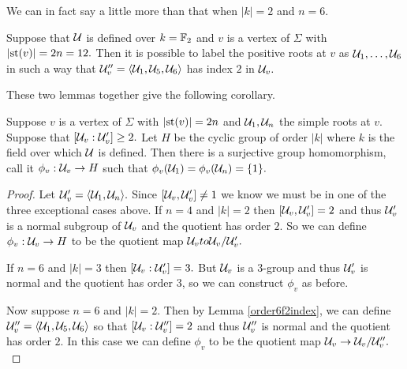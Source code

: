 \documentclass[class=book, crop=false,12 pt]{standalone}
\begin{document}
We can in fact say a little more than that when $|k|=2$ and $n=6.$
\begin{lemma}
	\label{order6f2index}
	Suppose that $\mathcal{U}$ is defined over $k=\mathbb{F}_{2}$ and $v$ is a vertex of $\Sigma$ with $|\mathrm{st}(v)|=2n=12.$ Then it is possible to label the positive roots at $v$ as $\mathcal{U}_1,\dots,\mathcal{U}_6$ in such a way that $\mathcal{U}''_v=\langle \mathcal{U}_1,\mathcal{U}_5,\mathcal{U}_6\rangle$ has index $2$ in $\mathcal{U}_v.$
\end{lemma}

These two lemmas together give the following corollary.
\begin{cor}
	\label{phiv}
	Suppose $v$ is a vertex of $\Sigma$ with $|\mathrm{st}(v)|=2n$ and $\mathcal{U}_1,\mathcal{U}_n$ the simple roots at $v.$ Suppose that $[\mathcal{U}_v:\mathcal{U}'_v]\ge 2.$ Let $H$ be the cyclic group of order $|k|$ where $k$ is the field over which $\mathcal{U}$ is defined. Then there is a surjective group homomorphism, call it $\phi_v:\mathcal{U}_v\to H$ such that $\phi_v(\mathcal{U}_1)=\phi_v(\mathcal{U}_n)=\{1\}.$
\end{cor}
\begin{proof}
	Let $\mathcal{U}'_v=\langle \mathcal{U}_1,\mathcal{U}_n\rangle.$ Since $[\mathcal{U}_v,\mathcal{U}'_v]\neq 1$ we know we must be in one of the three exceptional cases above. If $n=4$ and $|k|=2$ then $[\mathcal{U}_v,\mathcal{U}'_v]=2$ and thus $\mathcal{U}'_v$ is a normal subgroup of $\mathcal{U}_v$ and the quotient has order $2.$ So we can define $\phi_v:\mathcal{U}_v \to H$ to be the quotient map $\mathcal{U}_vto \mathcal{U}_v/\mathcal{U}'_v.$

	If $n=6$ and $|k|=3$ then $[\mathcal{U}_v:\mathcal{U}'_v]=3.$ But $\mathcal{U}_v$ is a 3-group and thus $\mathcal{U}'_v$ is normal and the quotient has order 3, so we can construct $\phi_v$ as before.

	Now suppose $n=6$ and $|k|=2.$ Then by Lemma \ref{order6f2index}, we can define $\mathcal{U}''_v=\langle \mathcal{U}_1,\mathcal{U}_5,\mathcal{U}_6\rangle$ so that $[\mathcal{U}_v:\mathcal{U}''_v]=2$ and thus $\mathcal{U}''_v$ is normal and the quotient has order $2.$ In this case we can define $\phi_v$ to be the quotient map $\mathcal{U}_v\to \mathcal{U}_v/\mathcal{U}''_v.$
\end{proof}
\end{document}
